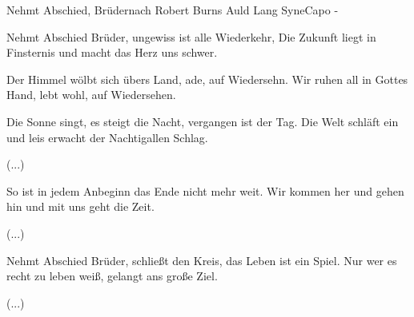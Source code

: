 \begin{song}{Nehmt Abschied, Brüder}{nach Robert Burns Auld Lang Syne}{Capo -}

Nehmt Abschied Brüder, ungewiss ist alle Wiederkehr,
Die Zukunft liegt in Finsternis und macht das Herz uns schwer.

Der Himmel wölbt sich übers Land, ade, auf Wiedersehn.
Wir ruhen all in Gottes Hand, lebt wohl, auf Wiedersehen.

Die Sonne singt, es steigt die Nacht, vergangen ist der Tag.
Die Welt schläft ein und leis erwacht der Nachtigallen Schlag.

 (...)

So ist in jedem Anbeginn das Ende nicht mehr weit.
Wir kommen her und gehen hin und mit uns geht die Zeit.

 (...)

Nehmt Abschied Brüder, schließt den Kreis, das Leben ist ein Spiel.
Nur wer es recht zu leben weiß, gelangt ans große Ziel.

 (...)

\end{song}